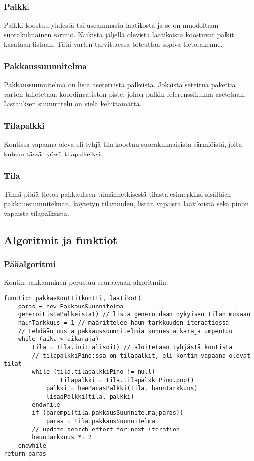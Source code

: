 \documentclass[a4paper,12pt, titlepage]{article}
\begin{document}
\subsubsection*{Palkki}
Palkki koostuu yhdestä tai useammasta laatikosta ja se on muodoltaan suorakulmainen särmiö. Kaikista jäljellä olevista laatikoista koostuvat palkit kasataan listaan. Tätä varten tarvittaessa toteuttaa sopiva tietorakenne.
\subsubsection*{Pakkaussuunnitelma}
Pakkaussuunnitelma on lista asetetuista palkeista. Jokaista setettua pakettia varten talletetaan koordinaatiston piste, johon palkin referenssikulma asetetaan. Listauksen suunnittelu on vielä kehittämättä.
\subsubsection*{Tilapalkki}
Kontissa vapaana oleva eli tyhjä tila koostuu suorakulmaisista särmiöistä, joita kutsun tässä työssä tilapalkeiksi.
\subsubsection*{Tila}
Tämä pitää tietoa pakkauksen tämänhetkisestä tilasta esimerkiksi sisältäen pakkaussuunnitelman, käytetyn tilavuuden, listan vapaista laatikoista sekä pinon vapaista tilapalkeista.
\subsection*{Algoritmit ja funktiot}
\subsubsection*{Pääalgoritmi}
Kontin pakkaaminen perustuu seuraavaan algoritmiin:
\begin{verbatim}
function pakkaaKontti(kontti, laatikot) 
    paras = new PakkausSuunnitelma
    generoiListaPalkeista() // lista generoidaan nykyisen tilan mukaan         
    haunTarkkuus = 1 // määrittelee haun tarkkuuden iteraatiossa
    // tehdään uusia pakkaussuunnitelmia kunnes aikaraja umpeutuu
    while (aika < aikaraja)
        tila = Tila.initialisoi() // aloitetaan tyhjästä kontista
        // tilapalkkiPino:ssa on tilapalkit, eli kontin vapaana olevat tilat
        while (tila.tilapalkkiPino != null)
        	    tilapalkki = tila.tilapalkkiPino.pop()
            palkki = haeParasPalkki(tila, haunTarkkuus)
            lisaaPalkki(tila, palkki)
        endwhile
        if (parempi(tila.pakkausSuunnitelma,paras))
            paras = tila.pakkausSuunnitelma
        // update search effort for next iteration                  	
        haunTarkkuus *= 2
    endwhile
return paras
\end{verbatim}
\end{document}
